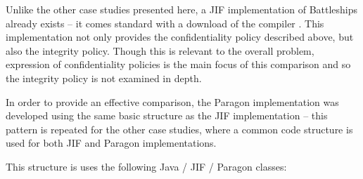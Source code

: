 Unlike the other case studies presented here, a JIF implementation of Battleships already exists -- it comes standard with a download of the compiler \cite{jifwebsite}. This implementation not only provides the confidentiality policy described above, but also the integrity policy. Though this is relevant to the overall problem, expression of confidentiality policies is the main focus of this comparison and so the integrity policy is not examined in depth.

In order to provide an effective comparison, the Paragon implementation was developed using the same basic structure as the JIF implementation -- this pattern is repeated for the other case studies, where a common code structure is used for both JIF and Paragon implementations.

This structure is uses the following Java / JIF / Paragon classes:

